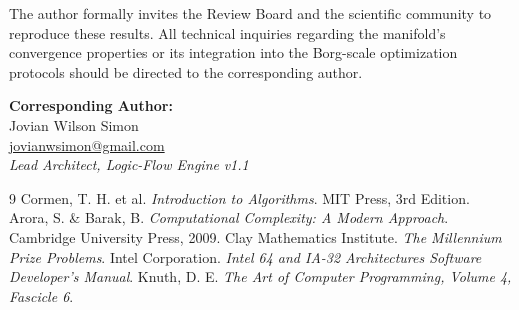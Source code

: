 \documentclass[11pt,a4paper]{article}
\begin{document}
The author formally invites the Review Board and the scientific community to reproduce these results. All technical inquiries regarding the manifold's convergence properties or its integration into the Borg-scale optimization protocols should be directed to the corresponding author.

\vspace{0.5cm}
\noindent \textbf{Corresponding Author:} \\
Jovian Wilson Simon \\
\href{mailto:jovianwsimon@gmail.com}{jovianwsimon@gmail.com} \\
\textit{Lead Architect, Logic-Flow Engine}
\textit{v1.1}


\begin{thebibliography}{9}
 Cormen, T. H. et al. \textit{Introduction to Algorithms}. MIT Press, 3rd Edition.
 Arora, S. \& Barak, B. \textit{Computational Complexity: A Modern Approach}. Cambridge University Press, 2009.
 Clay Mathematics Institute. \textit{The Millennium Prize Problems}.
 Intel Corporation. \textit{Intel 64 and IA-32 Architectures Software Developer’s Manual}.
 Knuth, D. E. \textit{The Art of Computer Programming, Volume 4, Fascicle 6}.
\end{thebibliography}
\end{document}
